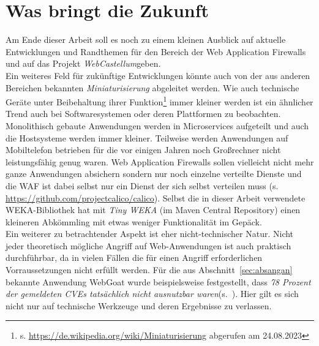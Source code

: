 \section{Was bringt die Zukunft}

Am Ende dieser Arbeit soll es noch zu einem kleinen Ausblick auf aktuelle Entwicklungen und Randthemen für den Bereich der Web Application Firewalls und auf das Projekt \glqq\emph{WebCastellum}\grqq geben.\\


Ein weiteres Feld für zukünftige Entwicklungen könnte auch von der aus anderen Bereichen bekannten \emph{Miniaturisierung} abgeleitet werden. Wie auch technische Geräte unter Beibehaltung ihrer Funktion\footnote{s. \url{https://de.wikipedia.org/wiki/Miniaturisierung} abgerufen am 24.08.2023} immer kleiner werden ist ein ähnlicher Trend auch bei Softwaresystemen oder deren Plattformen zu beobachten. Monolithisch gebaute Anwendungen werden in Microservices aufgeteilt und auch die Hostsysteme werden immer kleiner. Teilweise werden Anwendungen auf Mobiltelefon betrieben für die vor einigen Jahren noch Großrechner nicht leistungsfähig genug waren. Web Application Firewalls sollen vielleicht nicht mehr ganze Anwendungen absichern sondern nur noch einzelne verteilte Dienste und die WAF ist dabei selbst nur ein Dienst der sich selbst verteilen muss (s. \url{https://github.com/projectcalico/calico}). Selbst die in dieser Arbeit verwendete WEKA-Bibliothek hat mit \emph{Tiny WEKA} (im Maven Central Repository) einen kleineren Abkömmling mit etwas weniger Funktionalität im Gepäck.\\


Ein weiterer zu betrachtender Aspekt ist eher nicht-technischer Natur. Nicht jeder theoretisch mögliche Angriff auf Web-Anwendungen ist auch praktisch durchführbar, da in vielen Fällen die für einen Angriff erforderlichen Vorraussetzungen nicht erfüllt werden. Für die aus Abschnitt~\ref{sec:absangan} bekannte Anwendung WebGoat wurde beispielsweise festgestellt, dass \glqq\emph{78 Prozent der gemeldeten CVEs tatsächlich nicht ausnutzbar waren}\grqq (s.~\cite{lueck23}). Hier gilt es sich nicht nur auf technische Werkzeuge und deren Ergebnisse zu verlassen.\\

